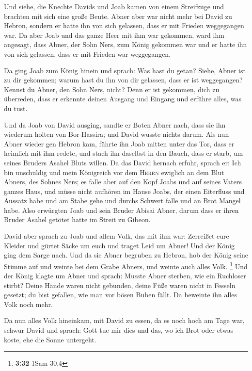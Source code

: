  Und siehe, die Knechte Davids und Joab kamen von einem
Streifzuge und brachten mit sich eine große Beute. Abner aber war nicht
mehr bei David zu Hebron, sondern er hatte ihn von sich gelassen, dass
er mit Frieden weggegangen war.  Da aber Joab und das
ganze Heer mit ihm war gekommen, ward ihm angesagt, dass Abner, der Sohn
Ners, zum König gekommen war und er hatte ihn von sich gelassen, dass er
mit Frieden war weggegangen.

 Da ging Joab zum König hinein und sprach: Was hast du
getan? Siehe, Abner ist zu dir gekommen; warum hast du ihn von dir
gelassen, dass er ist weggegangen?  Kennst du Abner, den
Sohn Ners, nicht? Denn er ist gekommen, dich zu überreden, dass er
erkennte deinen Ausgang und Eingang und erführe alles, was du tust.

 Und da Joab von David ausging, sandte er Boten Abner
nach, dass sie ihn wiederum holten von Bor-Hassira; und David wusste
nichts darum.  Als nun Abner wieder gen Hebron kam,
führte ihn Joab mitten unter das Tor, dass er heimlich mit ihm redete,
und stach ihn daselbst in den Bauch, dass er starb, um seines Bruders
Asahel Bluts willen.  Da das David hernach erfuhr, sprach
er: Ich bin unschuldig und mein Königreich vor dem \textsc{Herrn}
ewiglich an dem Blut Abners, des Sohnes Ners;  es falle
aber auf den Kopf Joabs und auf seines Vaters ganzes Haus, und müsse
nicht aufhören im Hause Joabs, der einen Eiterfluss und Aussatz habe und
am Stabe gehe und durchs Schwert falle und an Brot Mangel habe.
 Also erwürgten Joab und sein Bruder Abisai Abner, darum
dass er ihren Bruder Asahel getötet hatte im Streit zu Gibeon.

 David aber sprach zu Joab und allem Volk, das mit ihm
war: Zerreißet eure Kleider und gürtet Säcke um euch und traget Leid um
Abner! Und der König ging dem Sarge nach.  Und da sie
Abner begruben zu Hebron, hob der König seine Stimme auf und weinte bei
dem Grabe Abners, und weinte auch alles Volk. \footnote{\textbf{3:32}
  1Sam 30,4}  Und der König klagte um Abner und sprach:
Musste Abner sterben, wie ein Ruchloser stirbt?  Deine
Hände waren nicht gebunden, deine Füße waren nicht in Fesseln gesetzt;
du bist gefallen, wie man vor bösen Buben fällt. Da beweinte ihn alles
Volk noch mehr.

 Da nun alles Volk hineinkam, mit David zu essen, da es
noch hoch am Tage war, schwur David und sprach: Gott tue mir dies und
das, wo ich Brot oder etwas koste, ehe die Sonne untergeht.

